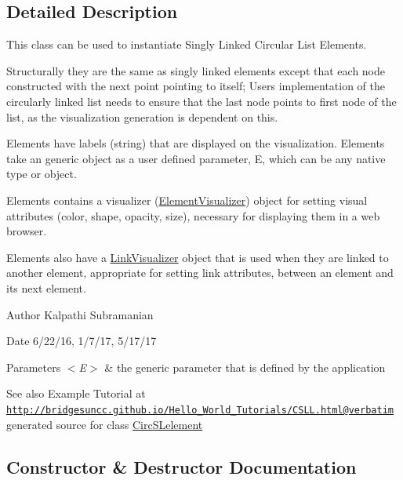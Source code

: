 \subsection{Detailed Description}
This class can be used to instantiate Singly Linked Circular List Elements. 

Structurally they are the same as singly linked elements except that each node constructed with the next point pointing to itself; User\textquotesingle{}s implementation of the circularly linked list needs to ensure that the last node points to first node of the list, as the visualization generation is dependent on this.

Elements have labels (string) that are displayed on the visualization. Elements take an generic object as a user defined parameter, E, which can be any native type or object.

Elements contains a visualizer (\hyperlink{namespace_element_visualizer}{Element\+Visualizer}) object for setting visual attributes (color, shape, opacity, size), necessary for displaying them in a web browser.

Elements also have a \hyperlink{namespace_link_visualizer}{Link\+Visualizer} object that is used when they are linked to another element, appropriate for setting link attributes, between an element and its next element.

\begin{DoxyAuthor}{Author}
Kalpathi Subramanian
\end{DoxyAuthor}
\begin{DoxyDate}{Date}
6/22/16, 1/7/17, 5/17/17
\end{DoxyDate}

\begin{DoxyParams}{Parameters}
{\em $<$\+E$>$} & the generic parameter that is defined by the application\\
\hline
\end{DoxyParams}
\begin{DoxySeeAlso}{See also}
Example Tutorial at ~\newline
 \href{http://bridgesuncc.github.io/Hello_World_Tutorials/CSLL.html@verbatim}{\tt http\+://bridgesuncc.\+github.\+io/\+Hello\+\_\+\+World\+\_\+\+Tutorials/\+C\+S\+L\+L.\+html@verbatim} generated source for class \hyperlink{class_circ_s_lelement_1_1_circ_s_lelement}{Circ\+S\+Lelement}  
\end{DoxySeeAlso}


\subsection{Constructor \& Destructor Documentation}
\hypertarget{class_circ_s_lelement_1_1_circ_s_lelement_a414aec286eae256d9ae223384c18a89a}{}\label{class_circ_s_lelement_1_1_circ_s_lelement_a414aec286eae256d9ae223384c18a89a} 
